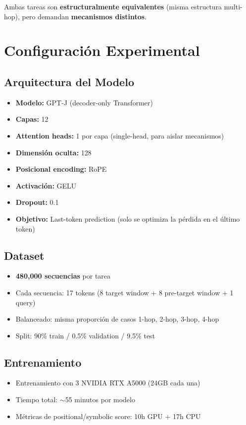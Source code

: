 \documentclass[conference]{IEEEtran}
\begin{document}
Ambas tareas son \textbf{estructuralmente equivalentes} (misma estructura multi-hop), pero demandan \textbf{mecanismos distintos}.

\section{Configuraci\'on Experimental}

\subsection{Arquitectura del Modelo}

\begin{itemize}
    \item \textbf{Modelo:} GPT-J (decoder-only Transformer)
    \item \textbf{Capas:} 12
    \item \textbf{Attention heads:} 1 por capa (single-head, para aislar mecanismos)
    \item \textbf{Dimensi\'on oculta:} 128
    \item \textbf{Posicional encoding:} RoPE
    \item \textbf{Activaci\'on:} GELU
    \item \textbf{Dropout:} 0.1
    \item \textbf{Objetivo:} Last-token prediction (solo se optimiza la p\'erdida en el \'ultimo token)
\end{itemize}

\subsection{Dataset}

\begin{itemize}
    \item \textbf{480,000 secuencias} por tarea
    \item Cada secuencia: 17 tokens (8 target window + 8 pre-target window + 1 query)
    \item Balanceado: misma proporci\'on de casos 1-hop, 2-hop, 3-hop, 4-hop
    \item Split: 90\% train / 0.5\% validation / 9.5\% test
\end{itemize}

\subsection{Entrenamiento}

\begin{itemize}
    \item Entrenamiento con 3 NVIDIA RTX A5000 (24GB cada una)
    \item Tiempo total: $\sim$55 minutos por modelo
    \item M\'etricas de positional/symbolic score: 10h GPU + 17h CPU
\end{itemize}
\end{document}
